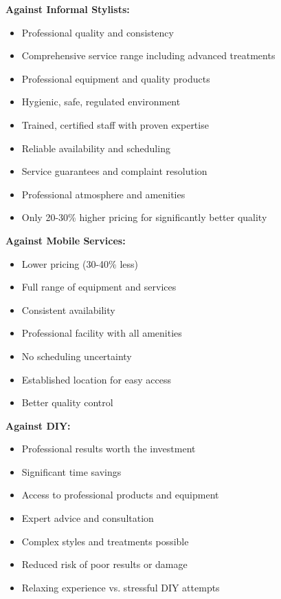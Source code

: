 \documentclass[a4paper,12pt]{article}
\begin{document}
\textbf{Against Informal Stylists:}
\begin{itemize}[leftmargin=2em]
    \item Professional quality and consistency
    \item Comprehensive service range including advanced treatments
    \item Professional equipment and quality products
    \item Hygienic, safe, regulated environment
    \item Trained, certified staff with proven expertise
    \item Reliable availability and scheduling
    \item Service guarantees and complaint resolution
    \item Professional atmosphere and amenities
    \item Only 20-30\% higher pricing for significantly better quality
\end{itemize}

\textbf{Against Mobile Services:}
\begin{itemize}[leftmargin=2em]
    \item Lower pricing (30-40\% less)
    \item Full range of equipment and services
    \item Consistent availability
    \item Professional facility with all amenities
    \item No scheduling uncertainty
    \item Established location for easy access
    \item Better quality control
\end{itemize}

\textbf{Against DIY:}
\begin{itemize}[leftmargin=2em]
    \item Professional results worth the investment
    \item Significant time savings
    \item Access to professional products and equipment
    \item Expert advice and consultation
    \item Complex styles and treatments possible
    \item Reduced risk of poor results or damage
    \item Relaxing experience vs. stressful DIY attempts
\end{itemize}
\end{document}
